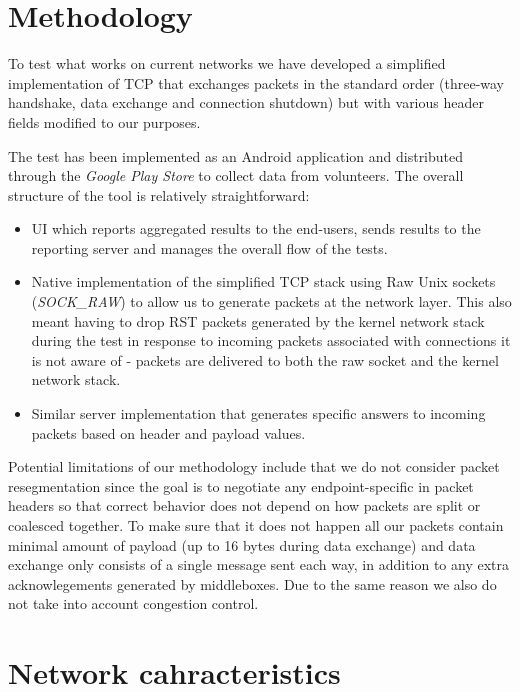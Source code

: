 \documentclass{sig-alternate-10pt}
\begin{document}
\section{Methodology}

To test what works on current networks we have developed a simplified implementation of TCP that exchanges packets in the standard order (three-way handshake, data exchange and connection shutdown) but with various header fields modified to our purposes.

The test has been implemented as an Android application and distributed through the \emph{Google Play Store} to collect data from volunteers. The overall structure of the tool is relatively straightforward:
\begin{itemize}
    \item UI which reports aggregated results to the end-users, sends results to the reporting server and manages the overall flow of the tests.
    \item Native implementation of the simplified TCP stack using Raw Unix sockets (\emph{SOCK\_RAW}) to allow us to generate packets at the network layer. This also meant having to drop RST packets generated by the kernel network stack during the test in response to incoming packets associated with connections it is not aware of - packets are delivered to both the raw socket and the kernel network stack.
    \item Similar server implementation that generates specific answers to incoming packets based on header and payload values.
\end{itemize}

Potential limitations of our methodology include that we do not consider packet resegmentation since the goal is to negotiate any endpoint-specific in packet headers so that correct behavior does not depend on how packets are split or coalesced together. To make sure that it does not happen all our packets contain minimal amount of payload (up to 16 bytes during data exchange) and data exchange only consists of a single message sent each way, in addition to any extra acknowlegements generated by middleboxes. Due to the same reason we also do not take into account congestion control.

\section{Network cahracteristics}
\label{sec:network}
\end{document}
